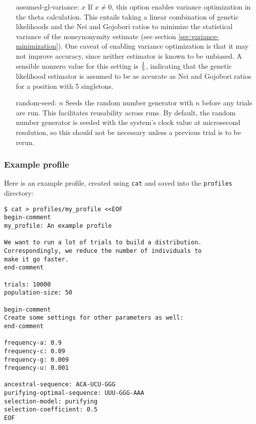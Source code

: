 \documentclass{article}
\begin{document}
        \begin{enumerate}
          \item[assumed-gl-variance: $x$]
	  If $x \neq 0$, this option enables variance optimization in the theta
	  calculation. This entails taking a linear combination of genetic
	  likelihoods and the Nei and Gojobori ratios to minimize the
	  statistical variance of the nonsynonymity estimate (see section
	      \ref{sec:variance-minimization}). One caveat of enabling variance
	  optimization is that it may not improve accuracy, since neither
	  estimator is known to be unbiased. A sensible nonzero value for this
	  setting is $1 \over 5$, indicating that the genetic likelihood
	  estimator is assumed to be as accurate as Nei and Gojobori ratios for
	  a position with 5 singletons.

          \item[random-seed: $n$]
          Seeds the random number generator with $n$ before any trials are run.
          This facilitates reusability across runs. By default, the random
          number generator is seeded with the system's clock value at
          microsecond resolution, so this should not be necessary unless a
          previous trial is to be rerun.
        \end{enumerate}

      \subsubsection{Example profile}
        \label{sec:example-profile}

        Here is an example profile, created using \verb|cat| and saved into the
        \verb|profiles| directory:

        \begin{verbatim}
$ cat > profiles/my_profile <<EOF
begin-comment
my_profile: An example profile

We want to run a lot of trials to build a distribution.
Correspondingly, we reduce the number of individuals to
make it go faster.
end-comment

trials: 10000
population-size: 50

begin-comment
Create some settings for other parameters as well:
end-comment

frequency-a: 0.9
frequency-c: 0.09
frequency-g: 0.009
frequency-u: 0.001

ancestral-sequence: ACA-UCU-GGG
purifying-optimal-sequence: UUU-GGG-AAA
selection-model: purifying
selection-coefficient: 0.5
EOF
        \end{verbatim}
\end{document}
